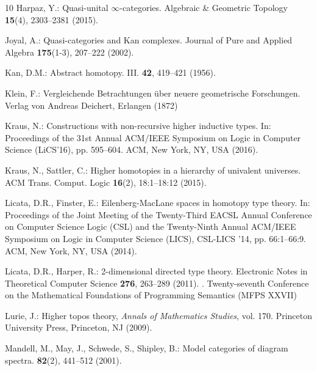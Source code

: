 \documentclass[12pt]{article}
\begin{document}
\begin{thebibliography}{10}
Harpaz, Y.: Quasi-unital {$\infty$}-categories.
\newblock Algebraic \& Geometric Topology \textbf{15}(4), 2303–2381 (2015).
\newblock {}

Joyal, A.: Quasi-categories and {Kan} complexes.
\newblock Journal of Pure and Applied Algebra \textbf{175}(1-3), 207--222
  (2002).
\newblock {}

{Kan}, D.M.: Abstract homotopy. {III}.
 \textbf{42}, 419--421 (1956).
\newblock {}

Klein, F.: {Vergleichende Betrachtungen {\"u}ber neuere geometrische
  Forschungen}.
\newblock Verlag von Andreas Deichert, Erlangen (1872)

Kraus, N.: Constructions with non-recursive higher inductive types.
\newblock In: Proceedings of the 31st Annual ACM/IEEE Symposium on Logic in
  Computer Science (LiCS'16), pp. 595--604. ACM, New York, NY, USA (2016).
\newblock {}

Kraus, N., Sattler, C.: Higher homotopies in a hierarchy of univalent
  universes.
\newblock ACM Trans. Comput. Logic \textbf{16}(2), 18:1--18:12 (2015).
\newblock {}

Licata, D.R., Finster, E.: {Eilenberg-MacLane} spaces in homotopy type theory.
\newblock In: Proceedings of the Joint Meeting of the Twenty-Third EACSL Annual
  Conference on Computer Science Logic (CSL) and the Twenty-Ninth Annual
  ACM/IEEE Symposium on Logic in Computer Science (LICS), CSL-LICS '14, pp.
  66:1--66:9. ACM, New York, NY, USA (2014).
\newblock {}

Licata, D.R., Harper, R.: 2-dimensional directed type theory.
\newblock Electronic Notes in Theoretical Computer Science \textbf{276},
  263--289 (2011).
\newblock {}.
\newblock Twenty-seventh Conference on the Mathematical Foundations of
  Programming Semantics (MFPS XXVII)

Lurie, J.: Higher topos theory, \emph{Annals of Mathematics Studies}, vol. 170.
\newblock Princeton University Press, Princeton, NJ (2009).
\newblock {}

{Mandell}, M., {May}, J., {Schwede}, S., {Shipley}, B.: Model categories of
  diagram spectra.
 \textbf{82}(2), 441--512 (2001).
\newblock {}


\end{thebibliography}
\end{document}

